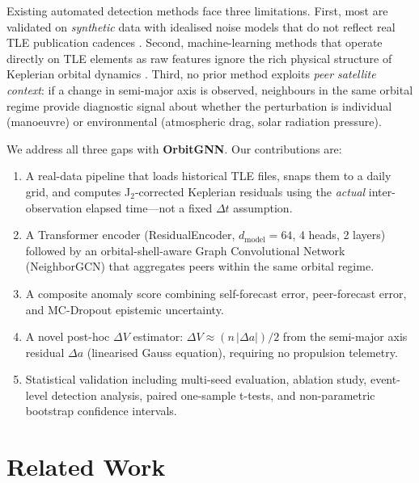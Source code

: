 \documentclass[conference]{IEEEtran}
\begin{document}
Existing automated detection methods face three limitations. First,
most are validated on \emph{synthetic} data with idealised noise
models that do not reflect real TLE publication cadences
\cite{mukundan2019,nguyen2022}. Second, machine-learning methods that
operate directly on TLE elements as raw features ignore the rich
physical structure of Keplerian orbital dynamics \cite{stevenson2022}.
Third, no prior method exploits \emph{peer satellite context}: if a
change in semi-major axis is observed, neighbours in the same orbital
regime provide diagnostic signal about whether the perturbation is
individual (manoeuvre) or environmental (atmospheric drag, solar
radiation pressure).

We address all three gaps with \textbf{OrbitGNN}. Our contributions
are:

\begin{enumerate}
  \item A real-data pipeline that loads historical TLE files, snaps
        them to a daily grid, and computes J$_2$-corrected Keplerian
        residuals using the \emph{actual} inter-observation elapsed
        time---not a fixed $\Delta t$ assumption.

  \item A Transformer encoder (ResidualEncoder, $d_\text{model}=64$,
        4 heads, 2 layers) followed by an orbital-shell-aware Graph
        Convolutional Network (NeighborGCN) that aggregates peers
        within the same orbital regime.

  \item A composite anomaly score combining self-forecast error,
        peer-forecast error, and MC-Dropout epistemic uncertainty.

  \item A novel post-hoc $\Delta V$ estimator: $\Delta V \approx
        (n\,|\Delta a|)/2$ from the semi-major axis residual $\Delta a$
        (linearised Gauss equation), requiring no propulsion telemetry.

  \item Statistical validation including multi-seed evaluation, ablation
        study, event-level detection analysis, paired one-sample
        t-tests, and non-parametric bootstrap confidence intervals.
\end{enumerate}

\section{Related Work}
\label{sec:related}
\end{document}
